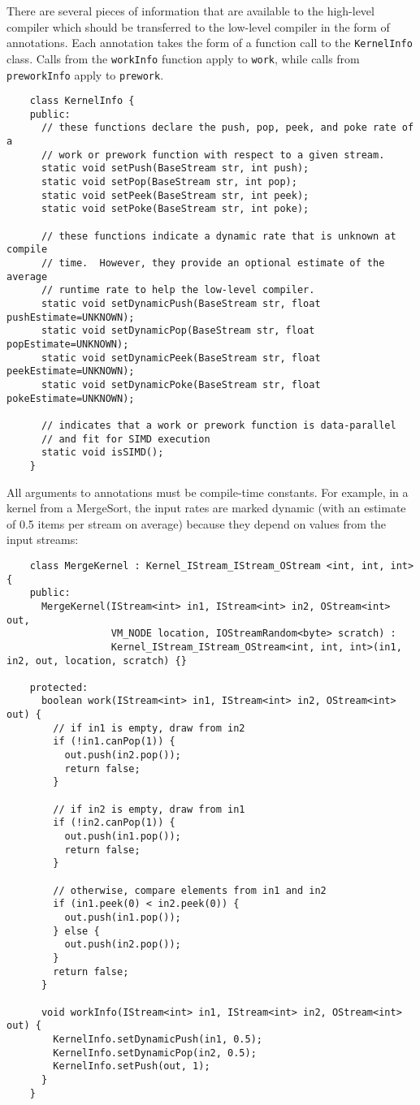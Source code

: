 There are several pieces of information that are available to the high-level compiler which
should be transferred to the low-level compiler in the form of annotations.  Each annotation
takes the form of a function call to the {\tt KernelInfo} class.  Calls from the {\tt workInfo}
function apply to {\tt work}, while calls from {\tt preworkInfo} apply to {\tt prework}.
{\small
\begin{verbatim}
    class KernelInfo {
    public:
      // these functions declare the push, pop, peek, and poke rate of a
      // work or prework function with respect to a given stream.
      static void setPush(BaseStream str, int push);
      static void setPop(BaseStream str, int pop);
      static void setPeek(BaseStream str, int peek);
      static void setPoke(BaseStream str, int poke);

      // these functions indicate a dynamic rate that is unknown at compile
      // time.  However, they provide an optional estimate of the average
      // runtime rate to help the low-level compiler.
      static void setDynamicPush(BaseStream str, float pushEstimate=UNKNOWN);
      static void setDynamicPop(BaseStream str, float popEstimate=UNKNOWN);
      static void setDynamicPeek(BaseStream str, float peekEstimate=UNKNOWN);
      static void setDynamicPoke(BaseStream str, float pokeEstimate=UNKNOWN);

      // indicates that a work or prework function is data-parallel 
      // and fit for SIMD execution
      static void isSIMD();
    }  
\end{verbatim}}

All arguments to annotations must be compile-time constants.  For
example, in a kernel from a MergeSort, the input rates are marked
dynamic (with an estimate of 0.5 items per stream on average) because
they depend on values from the input streams:
{\small
\begin{verbatim}
    class MergeKernel : Kernel_IStream_IStream_OStream <int, int, int> {
    public:
      MergeKernel(IStream<int> in1, IStream<int> in2, OStream<int> out, 
                  VM_NODE location, IOStreamRandom<byte> scratch) : 
                  Kernel_IStream_IStream_OStream<int, int, int>(in1, in2, out, location, scratch) {}

    protected:
      boolean work(IStream<int> in1, IStream<int> in2, OStream<int> out) {
        // if in1 is empty, draw from in2
        if (!in1.canPop(1)) {          
          out.push(in2.pop());
          return false;
        }

        // if in2 is empty, draw from in1
        if (!in2.canPop(1)) {
          out.push(in1.pop());
          return false;
        } 

        // otherwise, compare elements from in1 and in2
        if (in1.peek(0) < in2.peek(0)) {
          out.push(in1.pop());
        } else {
          out.push(in2.pop());
        }
        return false;
      }

      void workInfo(IStream<int> in1, IStream<int> in2, OStream<int> out) {
        KernelInfo.setDynamicPush(in1, 0.5);
        KernelInfo.setDynamicPop(in2, 0.5);
        KernelInfo.setPush(out, 1);
      }
    }  
\end{verbatim}}

